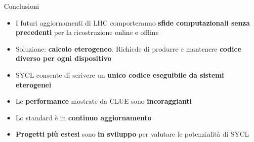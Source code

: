 \documentclass{beamer}
\begin{document}
\begin{frame}{Conclusioni}

\begin{itemize}
    \item I futuri aggiornamenti di LHC comporteranno \textbf{sfide computazionali senza precedenti} per la ricostruzione online e offline
    \item Soluzione: \textbf{calcolo eterogeneo}. Richiede di produrre e mantenere \textbf{codice diverso per ogni dispositivo}
    \item SYCL consente di scrivere un \textbf{unico codice eseguibile da sistemi eterogenei}
    \item Le \textbf{performance} mostrate da CLUE sono \textbf{incoraggianti}
     \item Lo standard è in \textbf{continuo aggiornamento}
    \item \textbf{Progetti più estesi} sono \textbf{in sviluppo} per valutare le potenzialità di SYCL
    
\end{itemize}
    
\end{frame}
\end{document}
